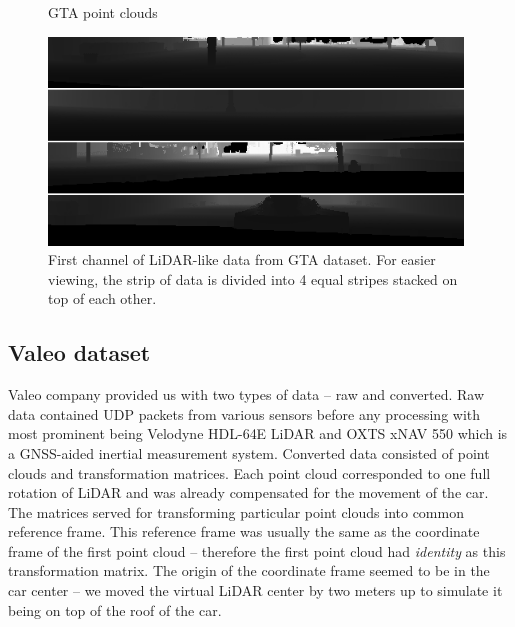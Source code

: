\begin{figure}
\centering
{}
\hfil
{}
\caption{GTA point clouds}
\end{figure}

\begin{figure}
\centering
\includegraphics[width=0.98\textwidth,keepaspectratio]{img/gtalidardepth.png}
\caption[First channel of LiDAR-like data from GTA dataset]{First channel of LiDAR-like data from GTA dataset. For easier viewing, the strip of data is divided into 4 equal stripes stacked on top of each other.}
\label{gtalidardepth}
\end{figure}

\subsection{Valeo dataset}
Valeo company provided us with two types of data -- raw and converted. Raw data contained UDP packets from various sensors before any processing with most prominent being Velodyne HDL-64E LiDAR and OXTS xNAV 550 which is a GNSS-aided inertial measurement system. Converted data consisted of point clouds and transformation matrices. Each point cloud corresponded to one full rotation of LiDAR and was already compensated for the movement of the car. The matrices served for transforming particular point clouds into common reference frame. This reference frame was usually the same as the coordinate frame of the first point cloud -- therefore the first point cloud had {\em identity} as this transformation matrix. The origin of the coordinate frame seemed to be in the car center -- we moved the virtual LiDAR center by two meters up to simulate it being on top of the roof of the car.

